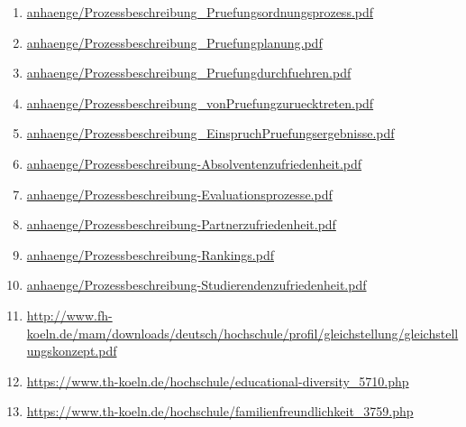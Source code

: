 \documentclass[BCOR12mm,DIV11,titlepage,a4paper,oneside,10pt]{scrbook}
\begin{document}
\begin{enumerate}
\item{\href{anhaenge/Prozessbeschreibung\_Pruefungsordnungsprozess.pdf}{anhaenge/Prozessbeschreibung\_Pruefungsordnungsprozess.pdf} } 
\item{\href{anhaenge/Prozessbeschreibung\_Pruefungplanung.pdf}{anhaenge/Prozessbeschreibung\_Pruefungplanung.pdf} } 
\item{\href{anhaenge/Prozessbeschreibung\_Pruefungdurchfuehren.pdf}{anhaenge/Prozessbeschreibung\_Pruefungdurchfuehren.pdf} } 
\item{\href{anhaenge/Prozessbeschreibung\_vonPruefungzuruecktreten.pdf}{anhaenge/Prozessbeschreibung\_vonPruefungzuruecktreten.pdf} } 
\item{\href{anhaenge/Prozessbeschreibung\_EinspruchPruefungsergebnisse.pdf}{anhaenge/Prozessbeschreibung\_EinspruchPruefungsergebnisse.pdf} } 
\item{\href{anhaenge/Prozessbeschreibung-Absolventenzufriedenheit.pdf}{anhaenge/Prozessbeschreibung-Absolventenzufriedenheit.pdf} } 
\item{\href{anhaenge/Prozessbeschreibung-Evaluationsprozesse.pdf}{anhaenge/Prozessbeschreibung-Evaluationsprozesse.pdf} } 
\item{\href{anhaenge/Prozessbeschreibung-Partnerzufriedenheit.pdf}{anhaenge/Prozessbeschreibung-Partnerzufriedenheit.pdf} } 
\item{\href{anhaenge/Prozessbeschreibung-Rankings.pdf}{anhaenge/Prozessbeschreibung-Rankings.pdf} } 
\item{\href{anhaenge/Prozessbeschreibung-Studierendenzufriedenheit.pdf}{anhaenge/Prozessbeschreibung-Studierendenzufriedenheit.pdf} } 
\item{\href{http://www.fh-koeln.de/mam/downloads/deutsch/hochschule/profil/gleichstellung/gleichstellungskonzept.pdf}{http://www.fh-koeln.de/mam/downloads/deutsch/hochschule/profil/gleichstellung/gleichstellungskonzept.pdf} } 
\item{\href{https://www.th-koeln.de/hochschule/educational-diversity\_5710.php}{https://www.th-koeln.de/hochschule/educational-diversity\_5710.php} } 
\item{\href{https://www.th-koeln.de/hochschule/familienfreundlichkeit\_3759.php}{https://www.th-koeln.de/hochschule/familienfreundlichkeit\_3759.php} } 

\end{enumerate}

\backmatter
\end{document}
